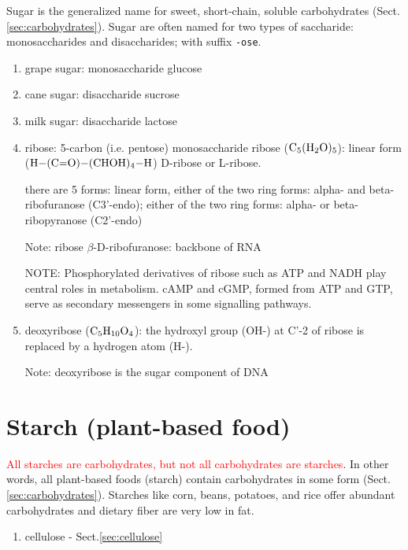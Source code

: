 Sugar is the generalized name for sweet, short-chain, soluble carbohydrates
(Sect.\ref{sec:carbohydrates}). Sugar are often named for two
types of saccharide: monosaccharides and disaccharides; with  suffix
\verb!-ose!.
\begin{enumerate}
  
  \item grape sugar:  monosaccharide glucose
  
  \item cane sugar: disaccharide sucrose
  
  \item milk sugar: disaccharide lactose
  
  \item ribose: 5-carbon (i.e. pentose) monosaccharide ribose ($\ce{C5(H2O)5}$):
  linear form ($\ce{H-(C=O)-(CHOH)4-H}$) D-ribose or L-ribose.
  
  there are 5 forms: linear form, either of the two ring
  forms: alpha- and beta-ribofuranose (C3'-endo); either of the two ring forms:
  alpha- or beta-ribopyranose (C2'-endo) 

 Note: ribose $\beta$-D-ribofuranose: backbone of RNA

NOTE: Phosphorylated derivatives of ribose such as ATP and NADH play central
roles in metabolism. cAMP and cGMP, formed from ATP and GTP, serve as secondary
messengers in some signalling pathways.  

   
    \item deoxyribose ($\ce{C5H10O4}$): the hydroxyl group (OH-) at C'-2 of
     ribose is replaced by a hydrogen atom (H-).
     
Note: deoxyribose is the sugar component of DNA
 

\end{enumerate}




\section{Starch (plant-based food)}
\label{sec:starch}

\textcolor{red}{ All starches are carbohydrates, but not all carbohydrates are
starches}. In other words, all plant-based foods (starch) contain
carbohydrates in some form (Sect.\ref{sec:carbohydrates}).
Starches like corn, beans, potatoes, and rice offer abundant carbohydrates and
dietary fiber are very low in fat.
\begin{enumerate}
  \item cellulose - Sect.\ref{sec:cellulose}
\end{enumerate}

